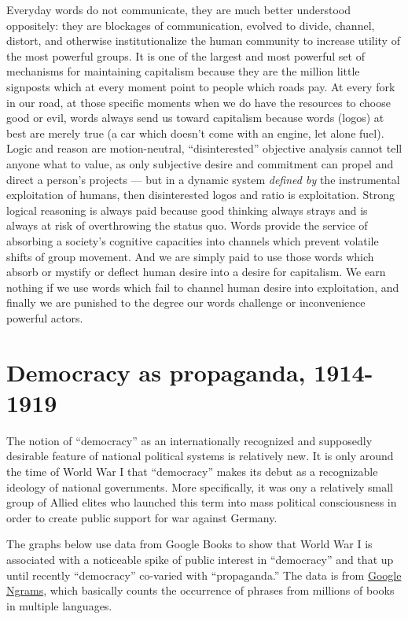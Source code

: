 \documentclass[12pt,book]{article}
\begin{document}
Everyday words do not communicate, they are much better understood
oppositely: they are blockages of communication, evolved to divide,
channel, distort, and otherwise institutionalize the human community to
increase utility of the most powerful groups. It is one of the largest
and most powerful set of mechanisms for maintaining capitalism because
they are the million little signposts which at every moment point to
people which roads pay. At every fork in our road, at those specific
moments when we do have the resources to choose good or evil, words
always send us toward capitalism because words (logos) at best are
merely true (a car which doesn't come with an engine, let alone fuel).
Logic and reason are motion-neutral, ``disinterested'' objective
analysis cannot tell anyone what to value, as only subjective desire and
commitment can propel and direct a person's projects --- but in a
dynamic system \emph{defined by} the instrumental exploitation of
humans, then disinterested logos and ratio is exploitation. Strong
logical reasoning is always paid because good thinking always strays and
is always at risk of overthrowing the status quo. Words provide the
service of absorbing a society's cognitive capacities into channels
which prevent volatile shifts of group movement. And we are simply paid
to use those words which absorb or mystify or deflect human desire into
a desire for capitalism. We earn nothing if we use words which fail to
channel human desire into exploitation, and finally we are punished to
the degree our words challenge or inconvenience powerful actors.

\section{Democracy as propaganda,
1914-1919}\label{democracy-as-propaganda-1914-1919}

The notion of ``democracy'' as an internationally recognized and
supposedly desirable feature of national political systems is relatively
new. It is only around the time of World War I that ``democracy'' makes
its debut as a recognizable ideology of national governments. More
specifically, it was ony a relatively small group of Allied elites who
launched this term into mass political consciousness in order to create
public support for war against Germany.

The graphs below use data from Google Books to show that World War I is
associated with a noticeable spike of public interest in ``democracy''
and that up until recently ``democracy'' co-varied with ``propaganda.''
The data is from \href{https://books.google.com/ngrams}{Google Ngrams},
which basically counts the occurrence of phrases from millions of books
in multiple languages.
\end{document}
